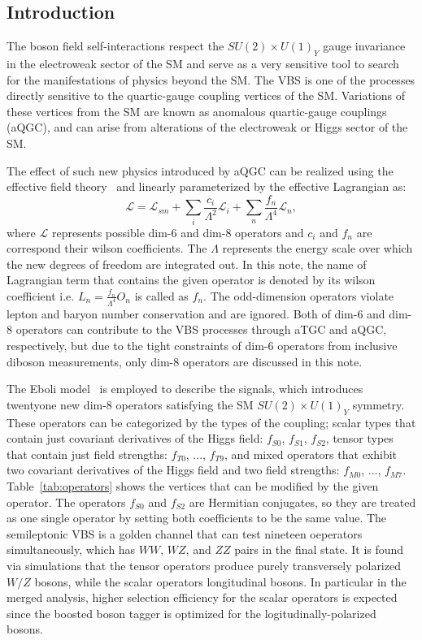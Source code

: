 
\subsection{Introduction}

The boson field self-interactions respect the $SU(2)\times U(1)_Y$ gauge invariance in the electroweak sector of the
SM and serve as a very sensitive tool to search for the manifestations of physics beyond the SM.
The VBS is one of the processes directly sensitive to the quartic-gauge coupling vertices of the SM.
Variations of these vertices from the SM are known as anomalous quartic-gauge couplings (aQGC), and can arise from alterations of the electroweak or Higgs sector of the SM.

The effect of such new physics introduced by aQGC can be realized using the effective field theory~\cite{degrande2013effective} and linearly parameterized by the effective Lagrangian as:
\begin{equation*}
  \mathcal{L}=\mathcal{L}_{sm}+\sum_{i}\frac{c_i}{\Lambda^{2}}\mathcal{L}_i+\sum_{n}\frac{f_n}{\Lambda^{4}}\mathcal{L}_n,
\end{equation*}
where $\mathcal{L}$ represents possible dim-6 and dim-8 operators and $c_i$ and $f_n$ are correspond their wilson coefficients. The $\Lambda$ represents the energy scale over which the new degrees of freedom are integrated out. 
In this note, the name of Lagrangian term that contains the given operator is denoted by its wilson coefficient i.e. $L_{n} = \frac{f_{n}}{\Lambda^4} O_{n}$ is called as $f_{n}$.
The odd-dimension operators violate lepton and baryon number conservation and are ignored.
Both of dim-6 and dim-8 operators can contribute to the VBS processes through aTGC and aQGC, respectively,
but due to the tight constraints of dim-6 operators from inclusive diboson measurements, only dim-8 operators are discussed in this note.

The Eboli model~\cite{eboli2006p} is employed to describe the signals, which introduces twentyone new dim-8 operators satisfying the SM $SU(2)\times U(1)_Y$ symmetry. 
These operators can be categorized by the types of the coupling; scalar types that contain just covariant derivatives of the Higgs field: $f_{S0}$, $f_{S1}$, $f_{S2}$, tensor types  that contain just field strengths: $f_{T0}$, ..., $f_{T9}$, and mixed operators that exhibit two covariant derivatives of the Higgs field and two field strengths: $f_{M0}$, ..., $f_{M7}$. 
Table~\ref{tab:operators} shows the vertices that can be modified by the given operator. 
The operators $f_{S0}$ and $f_{S2}$ are Hermitian conjugates, so they are treated as one single operator by setting both coefficients to be the same value.
The semileptonic VBS is a golden channel that can test nineteen oeperators simultaneously, which has  $WW$, $WZ$, and $ZZ$ pairs in the final state.
It is found via simulations that the tensor operators produce purely transversely polarized $W/Z$ bosons, while the scalar operators longitudinal bosons.
In particular in the merged analysis, higher selection efficiency for the scalar operators is expected since the boosted boson tagger is optimized for the logitudinally-polarized bosons.

